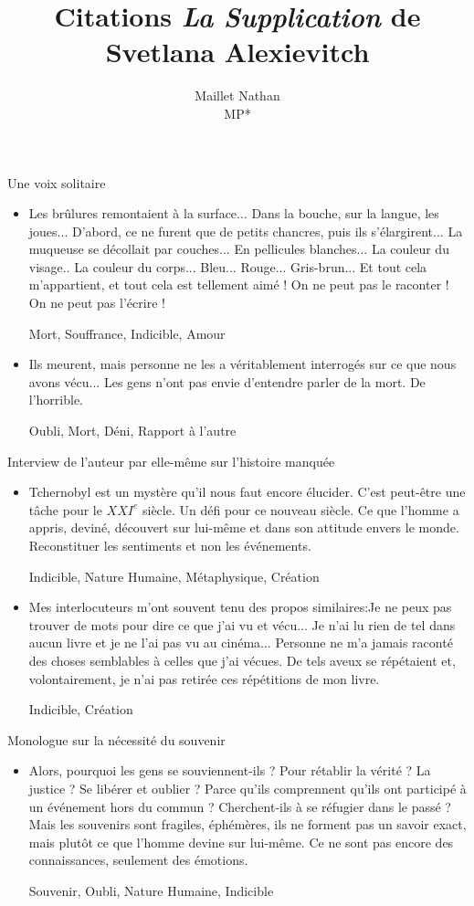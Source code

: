 \documentclass[french,a4paper,11pt,answers]{exam}
\title{Citations \emph{La Supplication} de Svetlana Alexievitch}
\author{Maillet Nathan\\MP*}
\date{}
\newcommand{\cit}[2]{\og #1 \fg{} \begin{solution}{ #2 }\end{solution}} %
\begin{document}
	\maketitle

	\begin{cadre}{Une voix solitaire}
		\begin{itemize}
			\item \cit {Les brûlures remontaient à la surface... Dans la bouche, sur la langue, les joues... D'abord, ce ne furent que de petits chancres, puis ils s'élargirent... La muqueuse se décollait par couches... En pellicules blanches... La couleur du visage.. La couleur du corps... Bleu... Rouge... Gris-brun... Et tout cela m'appartient, et tout cela est tellement aimé ! On ne peut pas le raconter ! On ne peut pas l'écrire !}{Mort, Souffrance, Indicible, Amour}			
			\item \cit {Ils meurent, mais personne ne les a véritablement interrogés sur ce que nous avons vécu... Les gens n'ont pas envie d'entendre parler de la mort. De l'horrible.}{Oubli, Mort, Déni, Rapport à l'autre}
		\end{itemize}
	\end{cadre}
	
	\begin{cadre}{Interview de l'auteur par elle-même sur l'histoire manquée}
		\begin{itemize}
			\item \cit {Tchernobyl est un mystère qu'il nous faut encore élucider. C'est peut-être une tâche pour le $XXI^e$ siècle. Un défi pour ce nouveau siècle. Ce que l'homme a appris, deviné, découvert sur lui-même et dans son attitude envers le monde. Reconstituer les sentiments et non les événements.}{Indicible, Nature Humaine, Métaphysique, Création}
			\item \cit{Mes interlocuteurs m'ont souvent tenu des propos similaires:\og Je ne peux pas trouver de mots pour dire ce que j'ai vu et vécu... Je n'ai lu rien de tel dans aucun livre et je ne l'ai pas vu au cinéma... Personne ne m'a jamais raconté des choses semblables à celles que j'ai vécues.\fg{} De tels aveux se répétaient et, volontairement, je n'ai pas retirée ces répétitions de mon livre.}{Indicible, Création}
		\end{itemize}
	\end{cadre}
	
	\begin{cadre}{Monologue sur la nécessité du souvenir}
		\begin{itemize}
			\item \cit {Alors, pourquoi les gens se souviennent-ils ? Pour rétablir la vérité ? La justice ? Se libérer et oublier ? Parce qu'ils comprennent qu'ils ont participé à un événement hors du commun ? Cherchent-ils à se réfugier dans le passé ? Mais les souvenirs sont fragiles, éphémères, ils ne forment pas un savoir exact, mais plutôt ce que l'homme devine sur lui-même. Ce ne sont pas encore des connaissances, seulement des émotions.}{Souvenir, Oubli, Nature Humaine, Indicible}
		\end{itemize}
	\end{cadre}
	
\end{document}
